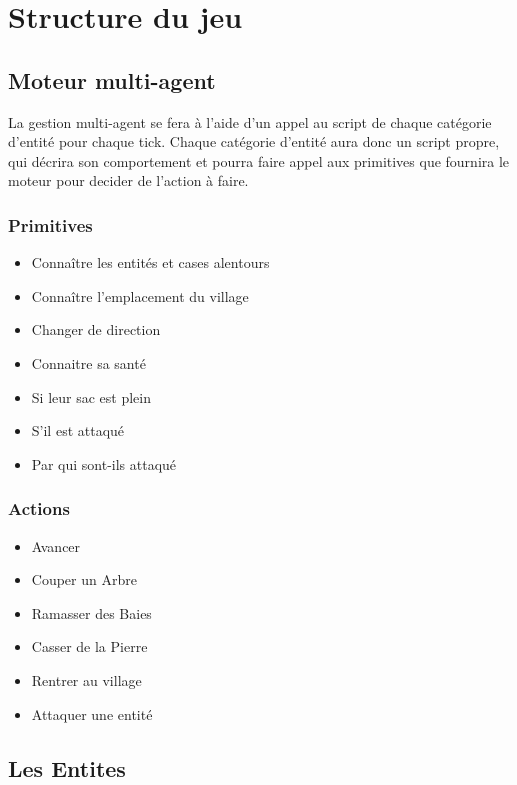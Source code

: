 \documentclass[a4paper]{memoir}
\begin{document}
		\section{Structure du jeu}
		
			\subsection{Moteur multi-agent}
				La gestion multi-agent se fera à l'aide d'un appel au script de chaque catégorie d'entité pour chaque tick. Chaque catégorie d'entité aura donc un script propre, qui décrira son comportement et pourra faire appel aux primitives que fournira le moteur pour decider de l'action à faire.

				\subsubsection{Primitives}
					\begin{itemize}[label=$\bullet$]
						\item Connaître les entités et cases alentours
						\item Connaître l'emplacement du village
						\item Changer de direction
						\item Connaitre sa santé
						\item Si leur sac est plein
						\item S'il est attaqué
						\item Par qui sont-ils attaqué
					\end{itemize}
			
			
				\subsubsection{Actions}
					\begin{itemize}[label=$\bullet$]
						\item Avancer
						\item Couper un Arbre
						\item Ramasser des Baies
						\item Casser de la Pierre
						\item Rentrer au village
						\item Attaquer une entité
					\end{itemize}


			\subsection{Les Entites}
			
\end{document}
